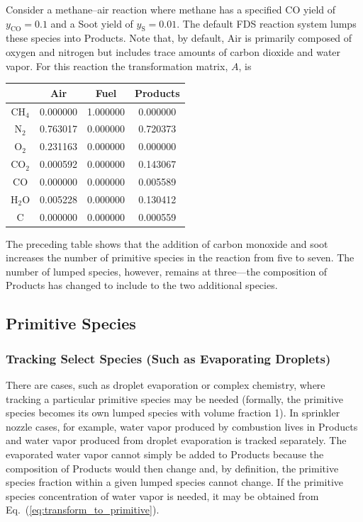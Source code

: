 Consider a methane--air reaction where methane has a specified CO yield of $y_{\mathrm{CO}}=0.1$ and a Soot yield of $y_{\mathrm{S}}=0.01$. The default FDS reaction system lumps these species into Products. Note that, by default, Air is primarily composed of oxygen and nitrogen but includes trace amounts of carbon dioxide and water vapor. For this reaction the transformation matrix, $A$, is

\begin{center}
\begin{tabular}{|c|c|c|c|}
\hline  & Air & Fuel & Products \\ \hline \hline
{CH$_4$}           & 0.000000 & 1.000000 & 0.000000 \\
{N$_2$}            & 0.763017 & 0.000000 & 0.720373 \\
{O$_2$}            & 0.231163 & 0.000000 & 0.000000 \\
{CO$_2$}           & 0.000592 & 0.000000 & 0.143067 \\
{CO}               & 0.000000 & 0.000000 & 0.005589 \\
{H$_2$O}           & 0.005228 & 0.000000 & 0.130412 \\
{C}                & 0.000000 & 0.000000 & 0.000559 \\ \hline
\end{tabular}
\end{center}

\noindent The preceding table shows that the addition of carbon monoxide and soot increases the number of primitive species in the reaction from five to seven. The number of lumped species, however, remains at three---the composition of Products has changed to include to the two additional species.


\subsection{Primitive Species}

\subsubsection{Tracking Select Species (Such as Evaporating Droplets)}

There are cases, such as droplet evaporation or complex chemistry, where tracking a particular primitive species may be needed (formally, the primitive species becomes its own lumped species with volume fraction 1). In sprinkler nozzle cases, for example, water vapor produced by combustion lives in Products and water vapor produced from droplet evaporation is tracked separately. The evaporated water vapor cannot simply be added to Products because the composition of Products would then change and, by definition, the primitive species fraction within a given lumped species cannot change. If the primitive species concentration of water vapor is needed, it may be obtained from Eq.~(\ref{eq:transform_to_primitive}).

